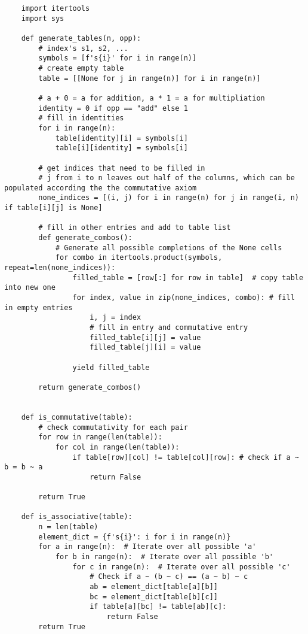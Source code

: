 \documentclass{article}
\begin{document}
\begin{verbatim}
    import itertools   
    import sys
    
    def generate_tables(n, opp):
        # index's s1, s2, ...
        symbols = [f's{i}' for i in range(n)]
        # create empty table
        table = [[None for j in range(n)] for i in range(n)]
    
        # a + 0 = a for addition, a * 1 = a for multipliation
        identity = 0 if opp == "add" else 1
        # fill in identities
        for i in range(n):
            table[identity][i] = symbols[i] 
            table[i][identity] = symbols[i]  
    
        # get indices that need to be filled in 
        # j from i to n leaves out half of the columns, which can be populated according the the commutative axiom
        none_indices = [(i, j) for i in range(n) for j in range(i, n) if table[i][j] is None]
    
        # fill in other entries and add to table list
        def generate_combos():
            # Generate all possible completions of the None cells
            for combo in itertools.product(symbols, repeat=len(none_indices)):
                filled_table = [row[:] for row in table]  # copy table into new one
                for index, value in zip(none_indices, combo): # fill in empty entries
                    i, j = index
                    # fill in entry and commutative entry
                    filled_table[i][j] = value
                    filled_table[j][i] = value 
    
                yield filled_table
    
        return generate_combos()
    
    
    def is_commutative(table):
        # check commutativity for each pair
        for row in range(len(table)):
            for col in range(len(table)):
                if table[row][col] != table[col][row]: # check if a ~ b = b ~ a
                    return False
        
        return True
    
    def is_associative(table):
        n = len(table)  
        element_dict = {f's{i}': i for i in range(n)}
        for a in range(n):  # Iterate over all possible 'a'
            for b in range(n):  # Iterate over all possible 'b'
                for c in range(n):  # Iterate over all possible 'c'
                    # Check if a ~ (b ~ c) == (a ~ b) ~ c
                    ab = element_dict[table[a][b]]
                    bc = element_dict[table[b][c]]
                    if table[a][bc] != table[ab][c]:
                        return False  
        return True  
    

\end{verbatim}
\end{document}

